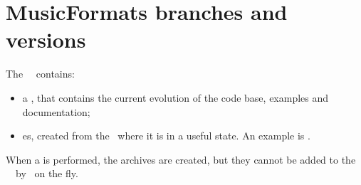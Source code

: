 
\chapter{MusicFormats branches and versions}\label{MusicFormats branches and versions}

The \mf\ \repo\ contains:
\begin{itemize}
\item a \masterBranch, that contains the current evolution of the code base, examples and documentation;
\item {} \branch es, created from the \masterBranch\ where it is in a useful state. An example is .
\end{itemize}

When a  is performed, the  archives are created, but they cannot be added to the \mf\ \repo\ by \github\ on the fly.

